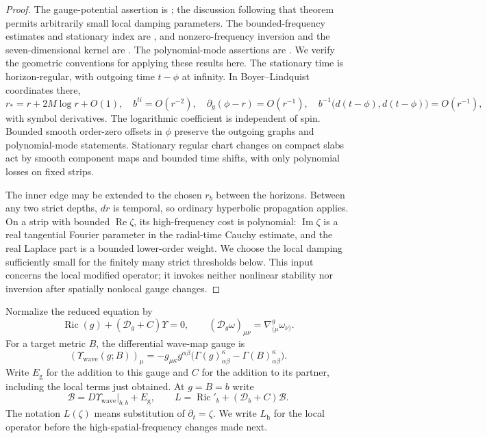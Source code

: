 \begin{proof}
The gauge-potential assertion is \cite[Theorem~5.1]{HHV2025};
the discussion following that theorem permits arbitrarily small local
damping parameters.  The bounded-frequency estimates and stationary
index are \cite[Theorem~5.2]{HHV2025}, and nonzero-frequency inversion
and the seven-dimensional kernel are \cite[Theorem~6.6]{HHV2025}.
The polynomial-mode assertions are
\cite[Proposition~6.8 and Lemma~6.9]{HHV2025}.
We verify the geometric conventions for applying these results here.
The stationary time is horizon-regular, with outgoing time
$t-\phi$ at infinity.  In Boyer--Lindquist coordinates there,
\[
 r_*=r+2M\log r+O(1),\quad b^{ti}=O(r^{-2}),\quad
 \partial_y(\phi-r)=O(r^{-1}),\quad
 b^{-1}\bigl(d(t-\phi),d(t-\phi)\bigr)=O(r^{-1}),
\]
with symbol derivatives.  The logarithmic coefficient is independent
of spin.  Bounded smooth order-zero offsets in $\phi$ preserve the
outgoing graphs and polynomial-mode statements.  Stationary regular
chart changes on compact slabs act by smooth component maps and
bounded time shifts, with only polynomial losses on fixed strips.

The inner edge may be extended to the chosen $r_b$ between the
horizons.  Between any two strict depths, $dr$ is temporal, so
ordinary hyperbolic propagation applies.  On a strip with bounded
$\operatorname{Re}\zeta$, its high-frequency cost is polynomial:
$\operatorname{Im}\zeta$ is a real tangential Fourier parameter in
the radial-time Cauchy estimate, and the real Laplace part is a
bounded lower-order weight.  We choose the local damping sufficiently
small for the finitely many strict thresholds below.  This input
concerns the local modified operator; it invokes neither nonlinear
stability nor inversion after spatially nonlocal gauge changes.
\end{proof}

Normalize the reduced equation by
\begin{equation}\label{st:reduced-normalization}
 \operatorname{Ric}(g)+(\mathcal D_g+C)\Upsilon=0,\qquad
 (\mathcal D_g\omega)_{\mu\nu}=\nabla^g_{(\mu}\omega_{\nu)}.
\end{equation}
For a target metric $B$, the differential wave-map gauge is
\begin{equation}\label{st:wave-gauge}
 (\Upsilon_{\mathrm{wave}}(g;B))_\mu
 =-g_{\mu\kappa}g^{\alpha\beta}
   \bigl(\Gamma(g)^\kappa_{\alpha\beta}
              -\Gamma(B)^\kappa_{\alpha\beta}\bigr).
\end{equation}
Write $E_{\mathrm g}$ for the addition to this gauge and $C$ for
the addition to its partner, including the local terms just obtained.
At $g=B=b$ write
\[
 \mathcal B=D\Upsilon_{\mathrm{wave}}|_{b;b}+E_{\mathrm g},
 \qquad
 L=\operatorname{Ric}'_b+(\mathcal D_b+C)\mathcal B.
\]
The notation $L(\zeta)$ means substitution of $\partial_t=\zeta$.
We write $L_{\mathrm h}$ for the local operator before the
high-spatial-frequency changes made next.

